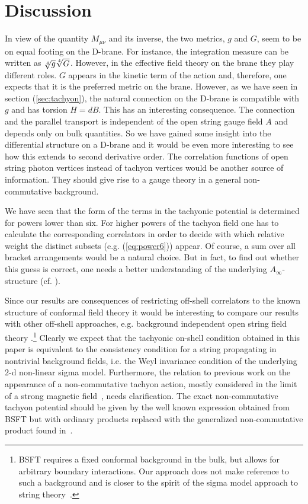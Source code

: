\documentclass[a4paper,11pt]{article}               \def\new#1\endnew{{\bf #1}}
\begin{document}
\section{Discussion}
\label{sec:disc}


In view of the quantity $M_{\mu\nu}$ and its inverse, the two metrics,
$g$ and $G$, seem to be on equal footing on the D-brane. For instance,
the integration measure can be written as $\root 4 \of {g} \root 4 \of {G}$. 
However, in the effective field theory on the brane they play
different roles. $G$ appears in the kinetic term of the 
action and, therefore, one expects that it is the preferred metric on
the brane. However, as we have seen in section (\ref{sec:tachyon}),
the natural connection on the D-brane is compatible with
$g$ and has torsion $H=dB$. This has an interesting consequence.
The connection and the parallel transport is independent
of the open string gauge field $A$ and depends only on bulk quantities.
So we have gained some insight into the differential structure on
a D-brane and it would be even more interesting to see how 
this extends to second derivative order. The correlation functions of
open string photon vertices instead of tachyon vertices would be another
source of information. They should give rise
to a gauge theory in a general non-commutative background.

We have seen that the form of the terms in the tachyonic potential is
determined for powers lower than six. For higher powers 
of the tachyon field one has to calculate the
corresponding correlators in order to decide with which relative
weight the distinct subsets (e.g. (\ref{eq:power6})) appear. 
Of course, a sum over all bracket arrangements would be a natural choice.
But in fact, to find out whether this
guess is correct, one needs a better understanding of the underlying
$A_\infty$-structure (cf. \cite{stasheff,Cornalba:2002sm}).

Since our results are consequences of restricting off-shell correlators 
to the known structure of conformal field theory it would be
interesting to compare our results with other off-shell approaches, 
e.g. background independent open string field theory
\cite{Witten:1992qy,Witten:1993cr,
Shatashvili:1993kk,Shatashvili:1993ps}.\footnote{%
  BSFT requires a fixed conformal background in the bulk, 
  but allows for arbitrary boundary interactions. Our approach does 
  not make reference to such a background and is closer to the spirit of the 
  sigma model approach to string theory~\cite{Tseytlin:1989rr}.
} 
Clearly we expect that the tachyonic on-shell condition obtained in this 
paper is equivalent to the consistency condition for a string propagating 
in nontrivial background fields, i.e. the Weyl invariance condition of the 
underlying 2-d non-linear sigma model. Furthermore, the relation to previous 
work on the appearance of a non-commutative tachyon action, mostly considered 
in the limit of a strong magnetic field~\cite{Cornalba:2001ad,Okuyama:2001ch}, 
needs clarification. The exact non-commutative tachyon potential 
should be given by the well known expression obtained from BSFT but with 
ordinary products replaced with the generalized non-commutative product found 
in~\cite{Herbst:2001ai}. 
\end{document}
